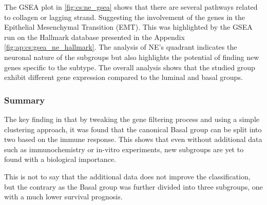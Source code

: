 The GSEA plot in \cref{fig:cs:ne_gsea} shows that there are several pathways related to collagen or lagging strand. Suggesting the involvement of the genes in the Epithelial Mesenchymal Transition (EMT). This was highlighted by the GSEA run on the Hallmark database presented in the Appendix \cref{fig:ap:cs:gsea_ne_hallmark}. The analysis of NE's quadrant indicates the neuronal nature of the subgroups but also highlights the potential of finding new genes specific to the subtype. The overall analysis shows that the studied group exhibit different gene expression compared to the luminal and basal groups. 



\subsubsection{Summary}

The key finding in that by tweaking the gene filtering process and using a simple clustering approach, it was found that the canonical Basal group can be split into two based on the immune response. This shows that even without additional data such as immunochemistry or in-vitro experiments, new subgroups are yet to found with a biological importance.

This is not to say that the additional data does not improve the classification, but the contrary as the Basal group was further divided into three subgroups, one with a much lower survival prognosis. 



